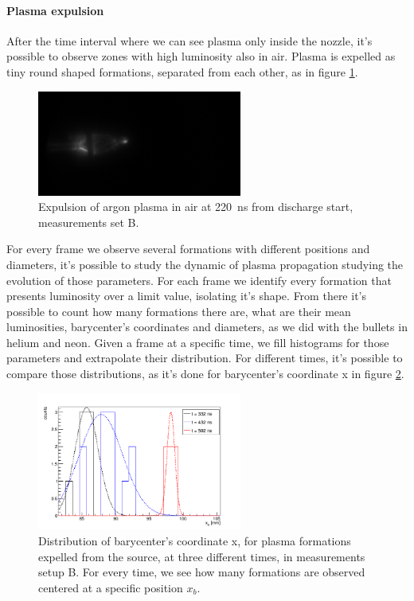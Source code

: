 \paragraph{Plasma expulsion}
After the time interval where we can see plasma only inside the nozzle, it's possible to observe zones with high luminosity also in air. Plasma is expelled as tiny round shaped formations, separated from each other, as in figure \ref{fig:arair_prop}.
\begin{figure}
 \centering
 \includegraphics[width=0.6\textwidth]{Images/Shape/argon_b_220.png}
 \caption{Expulsion of argon plasma in air at \SI{220}{\nano\second} from discharge start, measurements set B.}
 \label{fig:arair_prop}
\end{figure}

For every frame we observe several formations with different positions and diameters, it's possible to study the dynamic of plasma propagation studying the evolution of those parameters.
For each frame we identify every formation that presents luminosity over a limit value, isolating it's shape. From there it's possible to count how many formations there are, what are their mean luminosities, barycenter's coordinates and diameters, as we did with the bullets in helium and neon.
Given a frame at a specific time, we fill histograms for those parameters and extrapolate their distribution. For different times, it's possible to compare those distributions, as it's done for barycenter's coordinate x in figure \ref{fig:argon_xb_evol}. 
\begin{figure}
 \centering
 \includegraphics[width=0.6\textwidth]{Images/Shape/argon_b_xbevol.png}
 \caption{Distribution of barycenter's coordinate x, for plasma formations expelled from the source, at three different times, in measurements setup B. For every time, we see how many formations are observed centered at a specific position $x_b$.}
 \label{fig:argon_xb_evol}
\end{figure}



